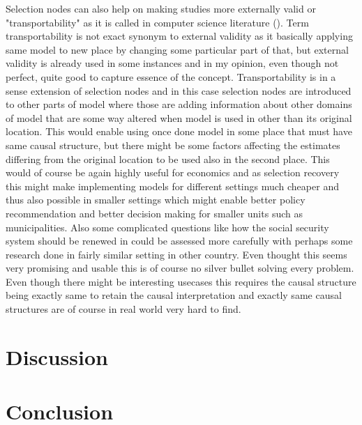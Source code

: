 \documentclass[main=english,12pt,a4paper,pdftex,econ,utf8]{aaltothesis}
\begin{document}
Selection nodes can also help on making studies more externally valid or "transportability" as it is called in computer science literature (\cite{Pearl2011}). Term transportability is not exact synonym to external validity as it basically applying same model to new place by changing some particular part of that, but external validity is already used in some instances and in my opinion, even though not perfect, quite good to capture essence of the concept. Transportability is in a sense extension of selection nodes and in this case selection nodes are introduced to other parts of model where those are adding information about other domains of model that are some way altered when model is used in other than its original location. This would enable using once done model in some place that must have same causal structure, but there might be some factors affecting the estimates differing from the original location to be used also in the second place. This would of course be again highly useful for economics and as selection recovery this might make implementing models for different settings much cheaper and thus also possible in smaller settings which might enable better policy recommendation and better decision making for smaller units such as municipalities. Also some complicated questions like how the social security system should be renewed in could be assessed more carefully with perhaps some research done in fairly similar setting in other country. Even thought this seems very promising and usable this is of course no silver bullet solving every problem. Even though there might be interesting usecases this requires the causal structure being exactly same to retain the causal interpretation and exactly same causal structures are of course in real world very hard to find.

\clearpage

\section{Discussion}



\clearpage

\section{Conclusion}

\clearpage

\printbibliography

\clearpage
\end{document}
